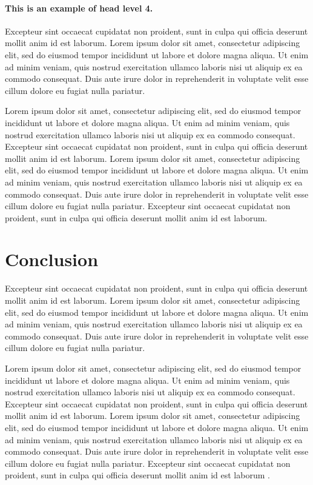 \documentclass[english]{sbc2025}%
\begin{document}
\paragraph{This is an example of head level 4.}

Excepteur sint occaecat cupidatat non proident, sunt in culpa qui officia deserunt mollit anim id est laborum. Lorem ipsum dolor sit amet, consectetur adipiscing elit, sed do eiusmod tempor incididunt ut labore et dolore magna aliqua. Ut enim ad minim veniam, quis nostrud exercitation ullamco laboris nisi ut aliquip ex ea commodo consequat. Duis aute irure dolor in reprehenderit in voluptate velit esse cillum dolore eu fugiat nulla pariatur. 

Lorem ipsum dolor sit amet, consectetur adipiscing elit, sed do eiusmod tempor incididunt ut labore et dolore magna aliqua. Ut enim ad minim veniam, quis nostrud exercitation ullamco laboris nisi ut aliquip ex ea commodo consequat. Excepteur sint occaecat cupidatat non proident, sunt in culpa qui officia deserunt mollit anim id est laborum. Lorem ipsum dolor sit amet, consectetur adipiscing elit, sed do eiusmod tempor incididunt ut labore et dolore magna aliqua. Ut enim ad minim veniam, quis nostrud exercitation ullamco laboris nisi ut aliquip ex ea commodo consequat. Duis aute irure dolor in reprehenderit in voluptate velit esse cillum dolore eu fugiat nulla pariatur. Excepteur sint occaecat cupidatat non proident, sunt in culpa qui officia deserunt mollit anim id est laborum.

\section{Conclusion}

Excepteur sint occaecat cupidatat non proident, sunt in culpa qui officia deserunt mollit anim id est laborum. Lorem ipsum dolor sit amet, consectetur adipiscing elit, sed do eiusmod tempor incididunt ut labore et dolore magna aliqua. Ut enim ad minim veniam, quis nostrud exercitation ullamco laboris nisi ut aliquip ex ea commodo consequat. Duis aute irure dolor in reprehenderit in voluptate velit esse cillum dolore eu fugiat nulla pariatur. 

Lorem ipsum dolor sit amet, consectetur adipiscing elit, sed do eiusmod tempor incididunt ut labore et dolore magna aliqua. Ut enim ad minim veniam, quis nostrud exercitation ullamco laboris nisi ut aliquip ex ea commodo consequat. Excepteur sint occaecat cupidatat non proident, sunt in culpa qui officia deserunt mollit anim id est laborum. Lorem ipsum dolor sit amet, consectetur adipiscing elit, sed do eiusmod tempor incididunt ut labore et dolore magna aliqua. Ut enim ad minim veniam, quis nostrud exercitation ullamco laboris nisi ut aliquip ex ea commodo consequat. Duis aute irure dolor in reprehenderit in voluptate velit esse cillum dolore eu fugiat nulla pariatur. Excepteur sint occaecat cupidatat non proident, sunt in culpa qui officia deserunt mollit anim id est laborum \citep{ref5}.
\end{document}
